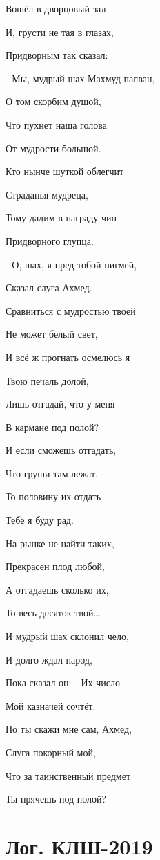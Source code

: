 \documentclass[12pt]{article}
\theoremstyle{definition}
\begin{document}
Вошёл в дворцовый зал

И, грусти не тая в глазах,

Придворным так сказал:

- Мы, мудрый шах Махмуд-палван,

О том скорбим душой,

Что пухнет наша голова

От мудрости большой.

Кто нынче шуткой облегчит

Страданья мудреца,

Тому дадим в награду чин

Придворного глупца.



- О, шах, я пред тобой пигмей, -

Сказал слуга Ахмед. –

Сравниться с мудростью твоей

Не может белый свет,

И всё ж прогнать осмелюсь я

Твою печаль долой,

Лишь отгадай, что у меня

В кармане под полой?

И если сможешь отгадать,

Что груши там лежат,

То половину их отдать

Тебе я буду рад.

На рынке не найти таких,

Прекрасен плод любой,

А отгадаешь сколько их,

То весь десяток твой… -

И мудрый шах склонил чело,

И долго ждал народ,

Пока сказал он: - Их число

Мой казначей сочтёт.

Но ты скажи мне сам, Ахмед,

Слуга покорный мой,

Что за таинственный предмет

Ты прячешь под полой?




\newpage

\section{Лог. КЛШ-2019}
\end{document}
